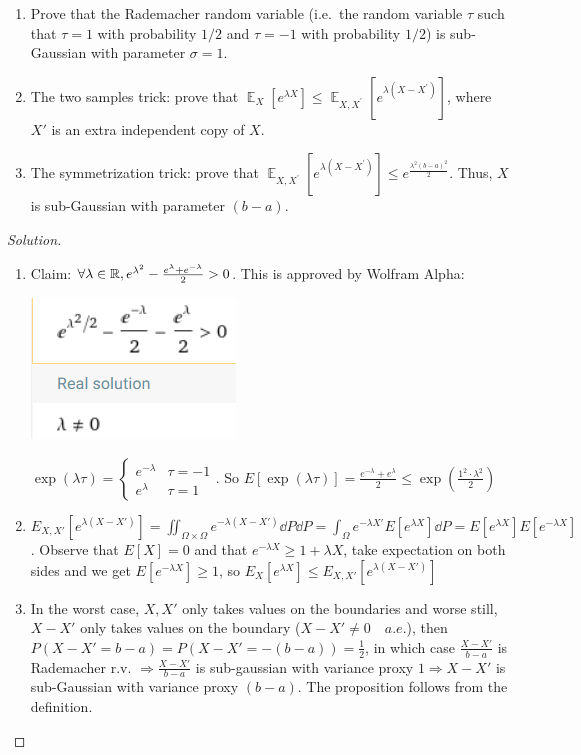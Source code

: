 \documentclass[12pt,letterpaper]{article}
\newenvironment{solution}{%
  \begin{proof}[Solution]$ $\par\nobreak\ignorespaces
}{%
  \end{proof}
}
\DeclareMathOperator*{\E}{\mathbb{E}}
\begin{document}
\begin{enumerate}
\begin{enumerate}[label=(\alph*)]
\item Prove that the Rademacher random variable (i.e.~the random variable $\tau$ such that $\tau=1$ with probability $1/2$ and $\tau=-1$ with probability $1/2$) is sub-Gaussian with parameter $\sigma=1$.
\item The two samples trick: prove that $ \E_{X}\left[e^{\lambda X}\right] \leq \E_{X, X^{\prime}}\left[e^{\lambda\left(X-X^{\prime}\right)}\right] $, where $X'$ is an extra independent copy of $X$.
\item The symmetrization trick: prove that $ \E_{X, X^{\prime}}\left[e^{\lambda\left(X-X^{\prime}\right)}\right] \leq e^{\frac{\lambda^2(b-a)^2}{2}} $. Thus, $X$ is sub-Gaussian with parameter $(b-a)$.
\end{enumerate}

\begin{solution}
\begin{enumerate}[label=(\alph*)]
\item
  Claim: $\forall\lambda\in\mathbb{R}, e^{\lambda^{2}}-\frac{e^{\lambda}+e^{-\lambda}}{2}>0$. This is approved by Wolfram Alpha:

  \includegraphics[scale=0.5]{pic.png}
  
  $\exp(\lambda\tau)=
  \begin{cases}
    e^{-\lambda}& \tau=-1\\ e^{\lambda}&\tau=1
  \end{cases}
  $.
  So $E[\exp(\lambda\tau)]=\frac{e^{-\lambda}+e^{\lambda}}{2}\leq \exp(\frac{1^{2}\cdot \lambda^{2}}{2})$
\item
  $E_{X,X'}[e^{\lambda(X-X')}]=\iint_{\Omega\times \Omega}e^{-\lambda(X-X')}\dd P\dd P=\int_{\Omega}e^{-\lambda X'}E[e^{\lambda X}]\dd P=E[e^{\lambda X}]E[e^{-\lambda X}]$. Observe that $E[X]=0$ and that $e^{-\lambda X}\geq 1+\lambda X$, take expectation on both sides and we get $E[e^{-\lambda X}]\geq 1$, so $E_{X}[e^{\lambda X}]\leq E_{X,X'}[e^{\lambda(X-X')}]$
\item In the worst case, $X,X'$ only takes values on the boundaries and worse still, $X-X'$ only takes values on the boundary ($X-X'\neq 0\quad a.e.$), then $P(X-X'=b-a)=P(X-X'=-(b-a))=\frac{1}{2}$, in which case $\frac{X-X'}{b-a}$ is Rademacher r.v. $\Rightarrow \frac{X-X'}{b-a}$ is sub-gaussian with variance proxy $1\Rightarrow X-X'$ is sub-Gaussian with variance proxy $(b-a)$. The proposition follows from the definition. 


\end{enumerate}
\end{solution}
\end{enumerate}
\end{document}
